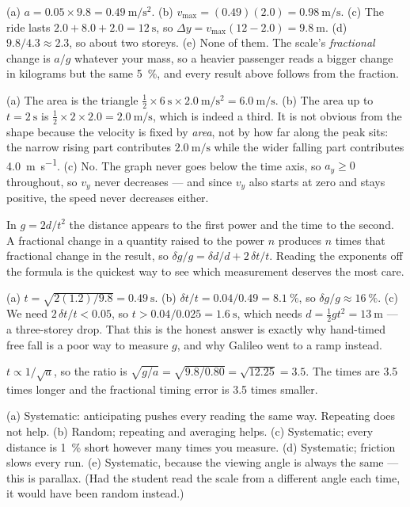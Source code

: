 \documentclass[11pt,twoside,openany]{book}
\begin{document}
\begin{description}[leftmargin=2.6em,itemsep=3pt,style=sameline]
  \item[2.67] (a) $a = 0.05 \times 9.8 = \SI{0.49}{\metre\per\second\squared}$. (b) $v_{\max} = (0.49)(2.0) = \SI{0.98}{\metre\per\second}$. (c) The ride lasts $2.0 + 8.0 + 2.0 = \SI{12}{\second}$, so $\Delta y = v_{\max}(12 - 2.0) = \SI{9.8}{\metre}$. (d) $9.8/4.3 \approx 2.3$, so about two storeys. (e) None of them. The scale's \emph{fractional} change is $a/g$ whatever your mass, so a heavier passenger reads a bigger change in kilograms but the same \SI{5}{\percent}, and every result above follows from the fraction.
  \item[2.68] (a) The area is the triangle $\tfrac12 \times \SI{6}{\second} \times \SI{2.0}{\metre\per\second\squared} = \SI{6.0}{\metre\per\second}$. (b) The area up to $t = \SI{2}{\second}$ is $\tfrac12 \times 2 \times 2.0 = \SI{2.0}{\metre\per\second}$, which is indeed a third. It is not obvious from the shape because the velocity is fixed by \emph{area}, not by how far along the peak sits: the narrow rising part contributes $\SI{2.0}{\metre\per\second}$ while the wider falling part contributes \SI{4.0}{\metre\per\second}. (c) No. The graph never goes below the time axis, so $a_y \ge 0$ throughout, so $v_y$ never decreases --- and since $v_y$ also starts at zero and stays positive, the speed never decreases either.
  \item[2.69] In $g = 2d/t^2$ the distance appears to the first power and the time to the second. A fractional change in a quantity raised to the power $n$ produces $n$ times that fractional change in the result, so $\delta g/g = \delta d/d + 2\,\delta t/t$. Reading the exponents off the formula is the quickest way to see which measurement deserves the most care.
  \item[2.70] (a) $t = \sqrt{2(1.2)/9.8} = \SI{0.49}{\second}$. (b) $\delta t/t = 0.04/0.49 = \SI{8.1}{\percent}$, so $\delta g/g \approx \SI{16}{\percent}$. (c) We need $2\,\delta t/t < 0.05$, so $t > 0.04/0.025 = \SI{1.6}{\second}$, which needs $d = \tfrac12 g t^2 = \SI{13}{\metre}$ --- a three-storey drop. That this is the honest answer is exactly why hand-timed free fall is a poor way to measure $g$, and why Galileo went to a ramp instead.
  \item[2.71] $t \propto 1/\sqrt{a}$, so the ratio is $\sqrt{g/a} = \sqrt{9.8/0.80} = \sqrt{12.25} = \num{3.5}$. The times are \num{3.5} times longer and the fractional timing error is \num{3.5} times smaller.
  \item[2.72] (a) Systematic: anticipating pushes every reading the same way. Repeating does not help. (b) Random; repeating and averaging helps. (c) Systematic; every distance is \SI{1}{\percent} short however many times you measure. (d) Systematic; friction slows every run. (e) Systematic, because the viewing angle is always the same --- this is parallax. (Had the student read the scale from a different angle each time, it would have been random instead.)

\end{description}
\end{document}
